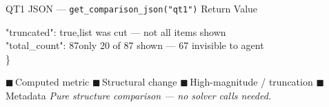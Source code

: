 \documentclass[aspectratio=169,10pt]{beamer}
\begin{document}
\begin{frame}[t]{QT1 JSON — \texttt{get\_comparison\_json("qt1")} Return Value}
\begin{block}{}
{    \quad "truncated": true,\hfill\textcolor{ared}{\tiny list was cut — not all items shown}\\
    \quad "total\_count": 87\hfill\textcolor{ared}{\tiny only 20 of 87 shown — 67 invisible to agent}\\
    \}
  }
\end{block}
\vspace{1pt}
\centering\scriptsize
\textcolor{pblue}{$\blacksquare$}\,Computed metric\quad
\textcolor{aorng}{$\blacksquare$}\,Structural change\quad
\textcolor{ared}{$\blacksquare$}\,High-magnitude / truncation\quad
\textcolor{mgray}{$\blacksquare$}\,Metadata\qquad
\textcolor{mgray}{\textit{Pure structure comparison — no solver calls needed.}}
\end{frame}

\end{document}
